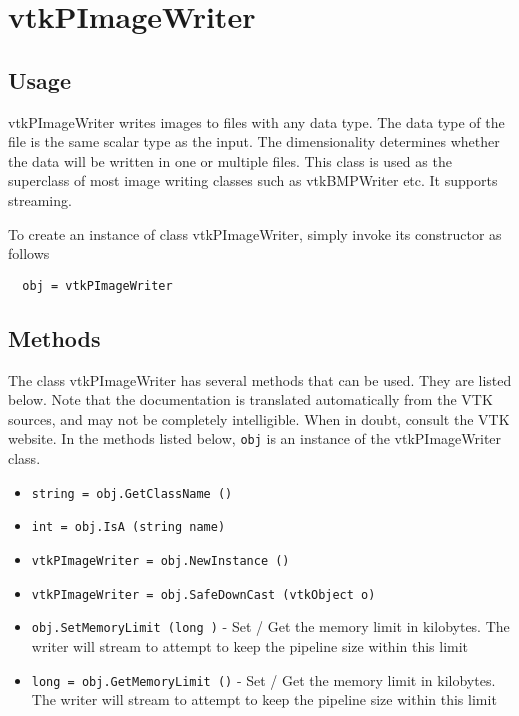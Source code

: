 \section{vtkPImageWriter}

\subsection{Usage}

 vtkPImageWriter writes images to files with any data type. The data type of
 the file is the same scalar type as the input.  The dimensionality
 determines whether the data will be written in one or multiple files.
 This class is used as the superclass of most image writing classes 
 such as vtkBMPWriter etc. It supports streaming.

To create an instance of class vtkPImageWriter, simply
invoke its constructor as follows
\begin{verbatim}
  obj = vtkPImageWriter
\end{verbatim}
\subsection{Methods}

The class vtkPImageWriter has several methods that can be used.
  They are listed below.
Note that the documentation is translated automatically from the VTK sources,
and may not be completely intelligible.  When in doubt, consult the VTK website.
In the methods listed below, \verb|obj| is an instance of the vtkPImageWriter class.
\begin{itemize}
\item  \verb|string = obj.GetClassName ()|

\item  \verb|int = obj.IsA (string name)|

\item  \verb|vtkPImageWriter = obj.NewInstance ()|

\item  \verb|vtkPImageWriter = obj.SafeDownCast (vtkObject o)|

\item  \verb|obj.SetMemoryLimit (long )| -  Set / Get the memory limit in kilobytes. The writer will
 stream to attempt to keep the pipeline size within this limit

\item  \verb|long = obj.GetMemoryLimit ()| -  Set / Get the memory limit in kilobytes. The writer will
 stream to attempt to keep the pipeline size within this limit

\end{itemize}
